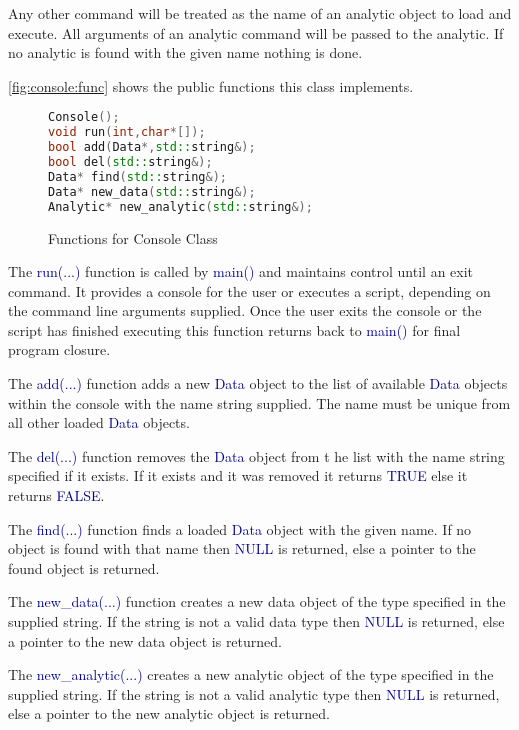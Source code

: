 \documentclass[10pt]{article}
\providecommand{\h}[1]{\textcolor{darkblue}{#1}}
\begin{document}
Any other command will be treated as the name of an analytic object to load and 
execute. All arguments of an analytic command will be passed to the analytic. 
If no analytic is found with the given name nothing is done.

\autoref{fig:console:func} shows the public functions this class implements.

\begin{figure}[H]
\begin{mdframed}[style=functions]
\begin{lstlisting}[language=C++]
Console();
void run(int,char*[]);
bool add(Data*,std::string&);
bool del(std::string&);
Data* find(std::string&);
Data* new_data(std::string&);
Analytic* new_analytic(std::string&);
\end{lstlisting}
\end{mdframed}
\caption{Functions for Console Class}
\label{fig:console:func}
\end{figure}

The \h{run(...)} function is called by \h{main()} and maintains control until 
an exit command. It provides a console for the user or executes a script, 
depending on the command line arguments supplied. Once the user exits the 
console or the script has finished executing this function returns back to 
\h{main()} for final program closure.

The \h{add(...)} function adds a new \h{Data} object to the list of 
available \h{Data} objects within the console with the name string supplied. 
The name must be unique from all other loaded \h{Data} objects.

The \h{del(...)} function removes the \h{Data} object from t he list with the 
name string specified if it exists. If it exists and it was removed it returns 
\h{TRUE} else it returns \h{FALSE}.

The \h{find(...)} function finds a loaded \h{Data} object with the given name. 
If no object is found with that name then \h{NULL} is returned, else a 
pointer to the found object is returned.

The \h{new\_data(...)} function creates a new data object of the type 
specified in the supplied string. If the string is not a valid data type then 
\h{NULL} is returned, else a pointer to the new data object is returned.

The \h{new\_analytic(...)} creates a new analytic object of the type specified 
in the supplied string. If the string is not a valid analytic type then 
\h{NULL} is returned, else a pointer to the new analytic object is returned.
\end{document}
